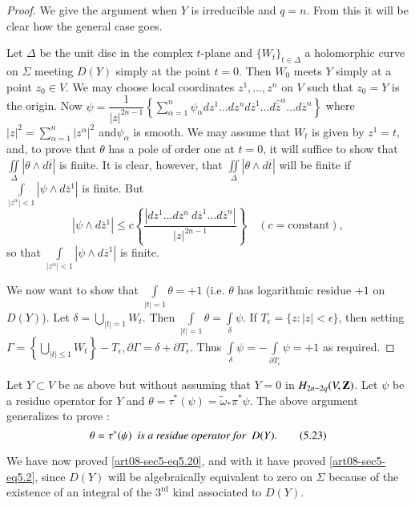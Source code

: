\begin{proof}
We give the argument when $Y$ is irreducible and $q=n$. From this it will be clear how the general case goes.

Let $\Delta$ be the unit disc in the complex $t$-plane and $\{W_{t}\}_{t\in \Delta}$ a holomorphic curve on $\Sigma$ meeting $D(Y)$ simply at the point $t=0$. Then $W_{0}$ meets $Y$ simply at a point $z_{0}\in V$. We may choose local coordinates $z^{1},\ldots,z^{n}$ on $V$ such that $z_{0}=Y$ is the origin. Now $\psi=\dfrac{1}{|z|^{2n-1}}\left\{\sum\limits^{n}_{\alpha=1}\psi_{\alpha}dz^{1}\ldots dz^{n}d\overline{z}^{1}\ldots d\widehat{\overline{z}}^{\alpha}\ldots d\overline{z}^{n}\right\}$ where $|z|^{2}=\sum\limits^{n}_{\alpha=1}|z^{\alpha}|^{2}$ and\pageoriginale $\psi_{\alpha}$ is smooth. We may assume that $W_{t}$ is given by $z^{1}=t$, and, to prove that $\theta$ has a pole of order one at $t=0$, it will suffice to show that $\iint\limits_{\Delta}|\theta\wedge d\overline{t}|$ is finite. It is clear, however, that $\iint\limits_{\Delta}|\theta\wedge d\overline{t}|$ will be finite if $\int\limits_{|z^{\alpha}|<1}|\psi\wedge d\overline{z}^{1}|$ is finite. But
$$
|\psi \wedge d\overline{z}^{1}|\leq c\left\{\dfrac{|dz^{1}\ldots dz^{n} \ d\overline{z}^{1}\ldots d\overline{z}^{n}|}{|z|^{2n-1}}\right\}\quad(c=\text{constant}),
$$
so that $\int\limits_{|z^{\alpha}|<1}|\psi\wedge d\overline{z}^{1}|$ is finite.

We now want to show that $\int\limits_{|t|=1}\theta=+1$ (i.e. $\theta$ has logarithmic residue $+1$ on $D(Y)$). Let $\delta=\bigcup\limits_{|t|=1}W_{t}$. Then $\int\limits_{|t|=1}\theta=\int\limits_{\delta}\psi$. If $T_{\epsilon}=\{z:|z|<\epsilon\}$, then setting $\Gamma=\left\{\bigcup\limits_{|t|\leq 1}W_{t}\right\}-T_{\epsilon},\partial \Gamma=\delta+\partial T_{\epsilon}$. Thus $\int\limits_{\delta}\psi=-\int\limits_{\partial T_{\epsilon}}\psi=+1$ as required.
\end{proof}

\begin{remark*}
Let $Y\subset V$ be as above but without assuming that $Y=0$ in $H_{2n-2q}(V,\mathbf{Z})$. Let $\psi$ be a residue operator for $Y$ and $\theta=\tau^{*}(\psi)=\widetilde{\omega}_{*}\pi^{*}\psi$. The above argument generalizes to prove : 
\begin{equation*}
\theta=\tau^{*}(\psi)\text{~ \em is a residue operator for~ } D(Y).\tag{5.23}\label{art08-sec5-eq5.23}
\end{equation*}

We have now proved \eqref{art08-sec5-eq5.20}, and with it have proved \eqref{art08-sec5-eq5.2}, since $D(Y)$ will be algebraically equivalent to zero on $\Sigma$ because of the existence of an integral of the $3^{\text{rd}}$ kind associated to $D(Y)$.
\end{remark*}

